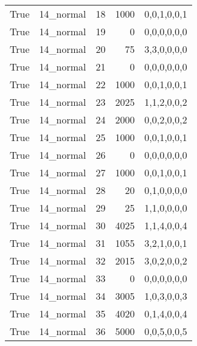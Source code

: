 \begin{tabular}{llrrl}
 True            & 14\_normal           &            18 &                  1000 & 0,0,1,0,0,1   \\
 True            & 14\_normal           &            19 &                     0 & 0,0,0,0,0,0   \\
 True            & 14\_normal           &            20 &                    75 & 3,3,0,0,0,0   \\
 True            & 14\_normal           &            21 &                     0 & 0,0,0,0,0,0   \\
 True            & 14\_normal           &            22 &                  1000 & 0,0,1,0,0,1   \\
 True            & 14\_normal           &            23 &                  2025 & 1,1,2,0,0,2   \\
 True            & 14\_normal           &            24 &                  2000 & 0,0,2,0,0,2   \\
 True            & 14\_normal           &            25 &                  1000 & 0,0,1,0,0,1   \\
 True            & 14\_normal           &            26 &                     0 & 0,0,0,0,0,0   \\
 True            & 14\_normal           &            27 &                  1000 & 0,0,1,0,0,1   \\
 True            & 14\_normal           &            28 &                    20 & 0,1,0,0,0,0   \\
 True            & 14\_normal           &            29 &                    25 & 1,1,0,0,0,0   \\
 True            & 14\_normal           &            30 &                  4025 & 1,1,4,0,0,4   \\
 True            & 14\_normal           &            31 &                  1055 & 3,2,1,0,0,1   \\
 True            & 14\_normal           &            32 &                  2015 & 3,0,2,0,0,2   \\
 True            & 14\_normal           &            33 &                     0 & 0,0,0,0,0,0   \\
 True            & 14\_normal           &            34 &                  3005 & 1,0,3,0,0,3   \\
 True            & 14\_normal           &            35 &                  4020 & 0,1,4,0,0,4   \\
 True            & 14\_normal           &            36 &                  5000 & 0,0,5,0,0,5   \\

\end{tabular}
